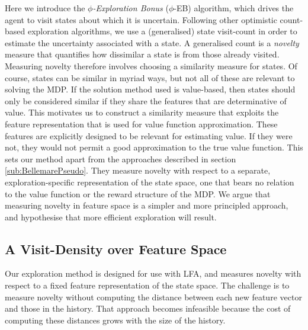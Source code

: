 \documentclass{article}
\theoremstyle{definition}
\theoremstyle{definition}
\theoremstyle{plain}
\theoremstyle{plain}
\theoremstyle{plain}
\begin{document}
Here we introduce the \emph{$\phi$-Exploration Bonus }($\phi$-EB)
algorithm, which drives the agent to visit states about which it is
uncertain. Following other optimistic count-based exploration algorithms,
we use a (generalised) state visit-count in order to estimate the
uncertainty associated with a state. A generalised count is a \emph{novelty}
measure that quantifies how dissimilar a state is from those already
visited. Measuring novelty therefore involves choosing a similarity
measure for states. Of course, states can be similar in myriad ways,
but not all of these are relevant to solving the MDP. If the solution
method used is value-based, then states should only be considered
similar if they share the features that are determinative of value.
This motivates us to construct a similarity measure that exploits
the feature representation that is used for value function approximation.
These features are explicitly designed\emph{ }to be relevant for estimating
value. If they were not, they would not permit a good approximation
to the true value function. This sets our method apart from the approaches
described in section \ref{sub:BellemarePseudo}. They measure novelty
with respect to a separate, exploration-specific representation of
the state space, one that bears no relation to the value function
or the reward structure of the MDP. We argue that measuring novelty
in feature space is a simpler and more principled approach, and hypothesise
that more efficient exploration will result.


\subsection{A Visit-Density over Feature Space\label{sub:A-Visit-Density-over}}

Our exploration method is designed for use with LFA, and measures
novelty with respect to a fixed feature representation of the state
space. The challenge is to measure novelty without computing the distance
between each new feature vector and those in the history. That approach
becomes infeasible because the cost of computing these distances grows
with the size of the history.
\end{document}

